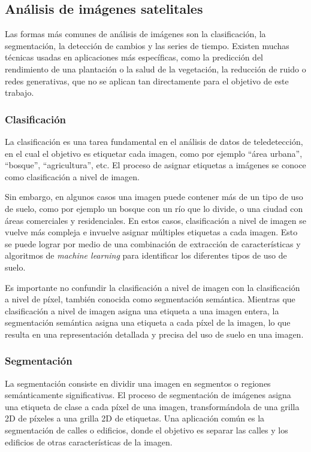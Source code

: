 \subsection{Análisis de imágenes satelitales}

Las formas más comunes de análisis de imágenes son la clasificación, la segmentación, la detección de cambios y las
series de tiempo. Existen muchas técnicas usadas en aplicaciones más específicas, como la predicción del rendimiento de
una plantación o la salud de la vegetación, la reducción de ruido o redes generativas, que no se aplican tan
directamente para el objetivo de este trabajo.

\subsubsection{Clasificación}

La clasificación es una tarea fundamental en el análisis de datos de teledetección, en el cual el objetivo es etiquetar
cada imagen, como por ejemplo \enquote{área urbana}, \enquote{bosque}, \enquote{agricultura}, etc. El proceso de
asignar etiquetas a imágenes se conoce como clasificación a nivel de imagen. \autocite{repo-satellite-image-dl}

Sin embargo, en algunos casos una imagen puede contener más de un tipo de uso de suelo, como por ejemplo un bosque con
un río que lo divide, o una ciudad con áreas comerciales y residenciales. En estos casos, clasificación a nivel de
imagen se vuelve más compleja e invuelve asignar múltiples etiquetas a cada imagen. Esto se puede lograr por medio de
una combinación de extracción de características y algoritmos de {\it machine learning} para identificar los diferentes
tipos de uso de suelo. \autocite{repo-satellite-image-dl}

Es importante no confundir la clasificación a nivel de imagen con la clasificación a nivel de píxel, también conocida
como segmentación semántica. Mientras que clasificación a nivel de imagen asigna una etiqueta a una imagen entera, la
segmentación semántica asigna una etiqueta a cada píxel de la imagen, lo que resulta en una representación detallada y
precisa del uso de suelo en una imagen. \autocite{cole-segmentation}

\subsubsection{Segmentación}

La segmentación consiste en dividir una imagen en segmentos o regiones semánticamente significativas. El proceso de
segmentación de imágenes asigna una etiqueta de clase a cada píxel de una imagen, transformándola de una grilla 2D de
píxeles a una grilla 2D de etiquetas. Una aplicación común es la segmentación de calles o edificios, donde el objetivo
es separar las calles y los edificios de otras características de la imagen. \autocite{repo-satellite-image-dl}

